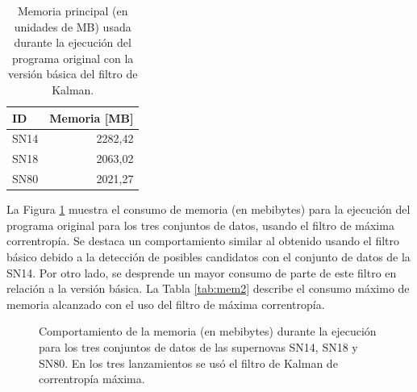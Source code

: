  
\begin{table}[h!]
\centering
\caption{Memoria principal (en unidades de MB) usada durante la ejecuci\'on del programa original con la versi\'on b\'asica del filtro de Kalman.}
\begin{tabular}{|l|r|}
\hline
\textbf{ID} & Memoria [MB]\\\hline\hline
SN14 & 2282,42\\\hline
SN18 & 2063,02\\\hline
SN80 & 2021,27\\\hline
\end{tabular}

\label{tab:mem1}
\end{table}


La Figura \ref{fig:mem_mcc} muestra el consumo de memoria (en mebibytes) para la ejecuci\'on del programa original para los tres conjuntos de datos, usando el filtro de m\'axima correntrop\'ia. Se destaca un comportamiento similar al obtenido usando el filtro b\'asico debido a  la detecci\'on de posibles candidatos con el conjunto de datos de la SN14. Por otro lado, se desprende un mayor consumo de parte de este filtro en relaci\'on a la versi\'on b\'asica. La Tabla \ref{tab:mem2} describe el consumo m\'aximo de memoria alcanzado con el uso del filtro de m\'axima correntrop\'ia.
\bigskip

\begin{figure}[h!]
\centering
{}\hfill
{}\vfill
{}
\caption{Comportamiento de la memoria (en mebibytes) durante la ejecuci\'on para los tres conjuntos de datos de las supernovas SN14, SN18 y SN80. En los tres lanzamientos se us\'o el filtro de Kalman de correntrop\'ia m\'axima.}
\label{fig:mem_mcc}
\end{figure}


